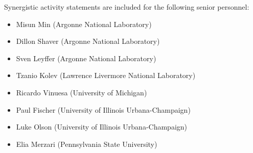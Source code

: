 Synergistic activity statements are included for the following senior personnel:

\begin{itemize} 
    \item Misun Min (Argonne National Laboratory)
    \item Dillon Shaver (Argonne National Laboratory) 
    \item Sven Leyffer (Argonne National Laboratory) 
    \item Tzanio Kolev (Lawrence Livermore National Laboratory)
    \item Ricardo Vinuesa (University of Michigan)
    \item Paul Fischer (University of Illinois Urbana-Champaign)
    \item Luke Olson (University of Illinois Urbana-Champaign)
    \item Elia Merzari (Pennsylvania State University)
\end{itemize} 

\newpage {}
\pagestyle{fancy} 


\newpage {}
\pagestyle{fancy} 


\newpage {}
\pagestyle{fancy} 


\newpage {}
\pagestyle{fancy} 


\newpage {}
\pagestyle{fancy} 



